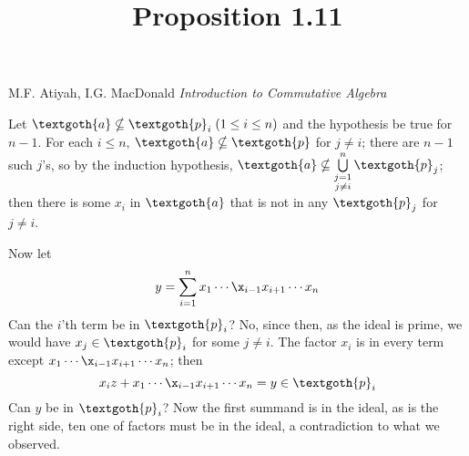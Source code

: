 \documentclass{article}
\title{Proposition 1.11}
\begin{document}
\maketitle

\begin{center}
M.F. Atiyah, I.G. MacDonald \emph{Introduction to Commutative Algebra}
\end{center}

\vspace*{10px} 

Let $ \textgoth{a} \nsubseteq \textgoth{p}_i \; (1 \leq i \leq n) $ and the hypothesis be true for $n - 1$. For each $i \leq n$, $ \textgoth{a} \nsubseteq \textgoth{p} $ for $ j \neq i $; there are $n - 1$ such $j$'s, so by the induction hypothesis, $ \textgoth{a} \nsubseteq \bigcup\limits_{\substack{ j=1 \\ j \neq i}}^n \textgoth{p}_j $; then there is some $x_i$ in $\textgoth{a}$ that is not in any $\textgoth{p}_j$ for $j \neq i$.

Now let 
\[
y = \sum_{i=1}^{n} x_1 \cdots \x_{i - 1} x_{i + 1} \cdots x_n
\]
Can the $i$'th term be in $\textgoth{p}_i $? No, since then, as the ideal is prime, we would have $x_j \in \textgoth{p}_i$ for some $j \neq i$. 
The factor $x_i$ is in every term except $x_1 \cdots \x_{i - 1} x_{i + 1} \cdots x_n$; then
\[
x_i z + x_1 \cdots \x_{i - 1} x_{i + 1} \cdots x_n= y \in \textgoth{p}_i  
\]
Can $y$ be in $\textgoth{p}_i $? Now the first summand is in the ideal, as is the right side, ten one of factors must be in the ideal, a contradiction to what we observed.
\end{document}
